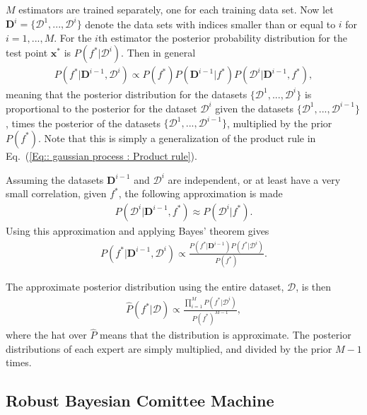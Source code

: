 \documentclass[twoside,english]{uiofysmaster}
\begin{document}
{$M$ estimators are trained separately, one for each training data set. Now let $\textbf{D}^{i} = \{ \mathcal{D}^1, ..., \mathcal{D}^i \}$ denote the data sets with indices smaller than or equal to $i$ for $i=1,...,M$. For the $i$th estimator the posterior probability distribution for the test point $\textbf{x}^*$ is $P(f^* | \mathcal{D}^{i})$. Then in general
\begin{align}
P(f^* |  \textbf{D}^{i-1}, \mathcal{D}^i) \propto P(f^*) P(\textbf{D}^{i-1} | f^*) P (\mathcal{D}^i | \textbf{D}^{i-1}, f^*),
\end{align}
meaning that the posterior distribution for the datasets $\{ \mathcal{D}^1,..., \mathcal{D}^i \}$ is proportional to the posterior for the dataset $\mathcal{D}^i$ given the datasets $\{\mathcal{D}^1,..., \mathcal{D}^{i-1} \}$, times the posterior of the datasets $\{ \mathcal{D}^1,..., \mathcal{D}^{i-1}\}$, multiplied by the prior $P(f^*)$. Note that this is simply a generalization of the product rule in Eq.~(\ref{Eq:: gaussian process : Product rule}).

Assuming the datasets $\textbf{D}^{i-1}$ and $\mathcal{D}^i$ are independent, or at least have a very small correlation, given $f^*$, the following approximation is made
\begin{align}\label{Eq:: evaluating cross : BCM assumption}
P(\mathcal{D}^i | \textbf{D}^{i-1},f^*) \approx P(\mathcal{D}^i | f^*).
\end{align}
Using this approximation and applying Bayes' theorem gives
\begin{align}
P(f^* | \textbf{D}^{i-1}, \mathcal{D}^i) \propto \frac{P(f^*|\textbf{D}^{i-1}) P(f^* | \mathcal{D}^i)}{P(f^*)}. 
\end{align}

The approximate posterior distribution using the entire dataset, $\mathcal{D}$, is then 
\begin{align}\label{Eq:: evaluating cross : BCM predictive distribution}
\hat{P}(f^* | \mathcal{D}) \propto \frac{\prod_{i=1}^M P(f^*| \mathcal{D}^i)}{P(f^*)^{M-1}} ,
\end{align}
where the hat over $\hat{P}$ means that the distribution is approximate. The posterior distributions of each expert are simply multiplied, and divided by the prior $M-1$ times.

\subsection{Robust Bayesian Comittee Machine}

}
\end{document}
